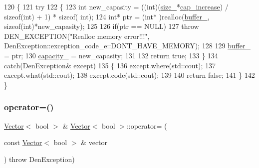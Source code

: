 \begin{DoxyCode}
120     \{
121         \textcolor{keywordflow}{try}
122             \{
123                 \textcolor{keywordtype}{int} new\_capasity = ((int)(\hyperlink{classVector_3_01bool_01_4_a07895adb41b2c819f85640e35c0d4ae0}{size\_}*\hyperlink{classVector_3_01bool_01_4_a6fe84e4e9414012807ec5ccd49711e62}{cap\_increase}) / \textcolor{keyword}{sizeof}(int) + 1) * \textcolor{keyword}{sizeof}(
      int);
124                 \textcolor{keywordtype}{int}* ptr = (\textcolor{keywordtype}{int}* )realloc(\hyperlink{classVector_3_01bool_01_4_ae2183c11de877eb13209c6a5a593604f}{buffer\_}, \textcolor{keyword}{sizeof}(\textcolor{keywordtype}{int})*new\_capasity);
125 
126                 \textcolor{keywordflow}{if}(ptr == NULL)
127                     \textcolor{keywordflow}{throw} DEN\_EXCEPTION(\textcolor{stringliteral}{"Realloc memory error!!!"}, 
      DenException::exception\_code\_e::DONT\_HAVE\_MEMORY);
128 
129                 \hyperlink{classVector_3_01bool_01_4_ae2183c11de877eb13209c6a5a593604f}{buffer\_} = ptr;
130                 \hyperlink{classVector_3_01bool_01_4_ac3da0e4580bca55cab445ed3f9c50f2d}{capacity\_} = new\_capasity;
131 
132                 \textcolor{keywordflow}{return} \textcolor{keyword}{true};
133             \}
134         \textcolor{keywordflow}{catch}(DenException& except)
135             \{
136                 except.where(std::cout);
137                 except.what(std::cout);
138                 except.code(std::cout);
139 
140                 \textcolor{keywordflow}{return} \textcolor{keyword}{false};
141             \}
142     \}
\end{DoxyCode}
\mbox{\label{classVector_3_01bool_01_4_ad5616dff05cceca72ddb94463c3be844}} 
\subsubsection{\texorpdfstring{operator=()}{operator=()}\hspace{0.1cm}{\footnotesize\ttfamily [1/2]}}
{\footnotesize\ttfamily \hyperlink{classVector}{Vector}$<$ bool $>$ \& \hyperlink{classVector}{Vector}$<$ bool $>$\+::operator= (\begin{DoxyParamCaption}\item[{const \hyperlink{classVector}{Vector}$<$ bool $>$ \&}]{vector }\end{DoxyParamCaption}) throw  Den\+Exception) }



